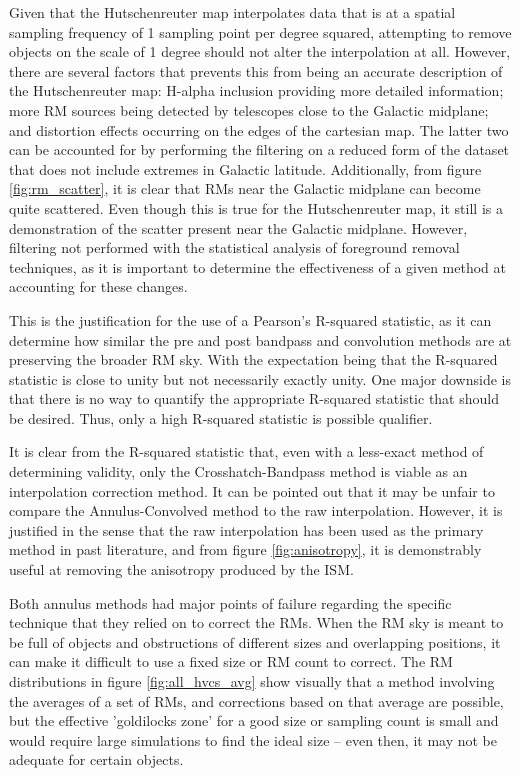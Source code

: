 Given that the Hutschenreuter map interpolates data that is at a spatial sampling frequency of 1 sampling point per degree squared, attempting to remove objects on the scale of 1 degree should not alter the interpolation at all. However, there are several factors that prevents this from being an accurate description of the Hutschenreuter map: H-alpha inclusion providing more detailed information; more RM sources being detected by telescopes close to the Galactic midplane; and distortion effects occurring on the edges of the cartesian map. The latter two can be accounted for by performing the filtering on a reduced form of the dataset that does not include extremes in Galactic latitude. Additionally, from figure \ref{fig:rm_scatter}, it is clear that RMs near the Galactic midplane can become quite scattered. Even though this is true for the Hutschenreuter map, it still is a demonstration of the scatter present near the Galactic midplane. However, filtering not performed with the statistical analysis of foreground removal techniques, as it is important to determine the effectiveness of a given method at accounting for these changes.


This is the justification for the use of a Pearson's R-squared statistic, as it can determine how similar the pre and post bandpass and convolution methods are at preserving the broader RM sky. With the expectation being that the R-squared statistic is close to unity but not necessarily exactly unity. One major downside is that there is no way to quantify the appropriate R-squared statistic that should be desired. Thus, only a high R-squared statistic is possible qualifier.


It is clear from the R-squared statistic that, even with a less-exact method of determining validity, only the Crosshatch-Bandpass method is viable as an interpolation correction method. It can be pointed out that it may be unfair to compare the Annulus-Convolved method to the raw interpolation. However, it is justified in the sense that the raw interpolation has been used as the primary method in past literature, and from figure \ref{fig:anisotropy}, it is demonstrably useful at removing the anisotropy produced by the ISM.


Both annulus methods had major points of failure regarding the specific technique that they relied on to correct the RMs. When the RM sky is meant to be full of objects and obstructions of different sizes and overlapping positions, it can make it difficult to use a fixed size or RM count to correct. The RM distributions in figure \ref{fig:all_hvcs_avg} show visually that a method involving the averages of a set of RMs, and corrections based on that average are possible, but the effective 'goldilocks zone' for a good size or sampling count is small and would require large simulations to find the ideal size – even then, it may not be adequate for certain objects.


